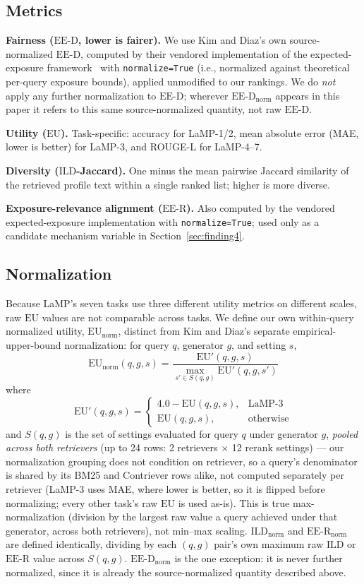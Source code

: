 \documentclass[11pt]{article}
\newcommand{\eed}{\ensuremath{\mathrm{EE\text{-}D}}}
\newcommand{\eer}{\ensuremath{\mathrm{EE\text{-}R}}}
\newcommand{\eu}{\ensuremath{\mathrm{EU}}}
\newcommand{\eunorm}{\ensuremath{\mathrm{EU}_{\mathrm{norm}}}}
\newcommand{\eednorm}{\ensuremath{\eed_{\mathrm{norm}}}}
\newcommand{\eernorm}{\ensuremath{\eer_{\mathrm{norm}}}}
\newcommand{\ild}{\ensuremath{\mathrm{ILD}}}
\newcommand{\ildnorm}{\ensuremath{\ild_{\mathrm{norm}}}}
\begin{document}
\subsection{Metrics}

\textbf{Fairness (\eed{}, lower is fairer).} We use Kim and Diaz's own
source-normalized \eed{}, computed by their vendored implementation of the
expected-exposure framework~\citep{diaz2020expectedexposure} with
\texttt{normalize=True} (i.e., normalized against theoretical per-query
exposure bounds), applied unmodified to our rankings. We do \emph{not}
apply any further normalization to \eed{}; wherever \eednorm{} appears in
this paper it refers to this same source-normalized quantity, not raw
\eed{}.

\textbf{Utility (\eu{}).} Task-specific: accuracy for LaMP-1/2, mean
absolute error (MAE, lower is better) for LaMP-3, and ROUGE-L for
LaMP-4--7.

\textbf{Diversity (\ild{}-Jaccard).} One minus the mean pairwise Jaccard
similarity of the retrieved profile text within a single ranked list;
higher is more diverse.

\textbf{Exposure-relevance alignment (\eer{}).} Also computed by the
vendored expected-exposure implementation with \texttt{normalize=True};
used only as a candidate mechanism variable in
Section~\ref{sec:finding4}.

\subsection{Normalization}
\label{sec:normalization}

Because LaMP's seven tasks use three different utility metrics on
different scales, raw \eu{} values are not comparable across tasks. We
define our own within-query normalized utility, \eunorm{}, distinct from
Kim and Diaz's separate empirical-upper-bound normalization: for query
$q$, generator $g$, and setting $s$,
\[
\eunorm(q,g,s) = \frac{\eu'(q,g,s)}{\max_{s'\in S(q,g)} \eu'(q,g,s')}
\]
where
\[
\eu'(q,g,s) = \begin{cases}
4.0 - \eu(q,g,s), & \text{LaMP-3}\\[2pt]
\eu(q,g,s), & \text{otherwise}
\end{cases}
\]
and $S(q,g)$ is the set of settings evaluated for query $q$ under
generator $g$, \emph{pooled across both retrievers} (up to 24 rows: 2
retrievers $\times$ 12 rerank settings) --- our normalization grouping
does not condition on retriever, so a query's denominator is shared by its
BM25 and Contriever rows alike, not computed separately per retriever
(LaMP-3 uses MAE, where lower is better, so it is flipped before
normalizing; every other task's raw \eu{} is used as-is). This is true
max-normalization (division by the largest raw value a query achieved
under that generator, across both retrievers), not min--max scaling.
\ildnorm{} and \eernorm{} are defined identically, dividing by each
$(q,g)$ pair's own maximum raw \ild{} or \eer{} value across $S(q,g)$.
\eednorm{} is the one exception: it is never further normalized, since it
is already the source-normalized quantity described above.
\end{document}
